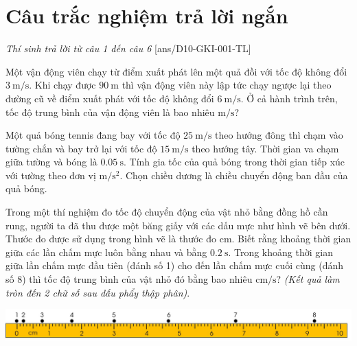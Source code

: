 \section{Câu trắc nghiệm trả lời ngắn} \textit{Thí sinh trả lời từ câu 1 đến câu 6}
\setcounter{ex}{0}
[ans/D10-GKI-001-TL]
\begin{ex}
	Một vận động viên chạy từ điểm xuất phát lên một quả đồi với tốc độ không đổi $\SI{3}{\meter/\second}$. Khi chạy được $\SI{90}{\meter}$ thì vận động viên này lập tức chạy ngược lại theo đường cũ về điểm xuất phát với tốc độ không đổi $\SI{6}{\meter/\second}$. Ở cả hành trình trên, tốc độ trung bình của vận động viên là bao nhiêu $\si{\meter/\second}$?
\end{ex}
\begin{ex}
	Một quả bóng tennis đang bay với tốc độ $\SI{25}{\meter/\second}$ theo hướng đông thì chạm vào tường chắn và bay trở lại với tốc độ $\SI{15}{\meter/\second}$ theo hướng tây. Thời gian va chạm giữa tường và bóng là $\SI{0.05}{\second}$. Tính gia tốc của quả bóng trong thời gian tiếp xúc với tường theo đơn vị $\si{\meter/\second^2}$. Chọn chiều dương là chiều chuyển động ban đầu của quả bóng.
	\loigiai{
	}
\end{ex}
\begin{ex}
	Trong một thí nghiệm đo tốc độ chuyển động của vật nhỏ bằng đồng hồ cần rung, người ta đã thu được một băng giấy với các dấu mực như hình vẽ bên dưới. Thước đo được sử dụng trong hình vẽ là thước đo $\si{\centi\meter}$. Biết rằng khoảng thời gian giữa các lần chấm mực luôn bằng nhau và bằng $\SI{0.2}{\second}$. Trong khoảng thời gian giữa lần chấm mực đầu tiên (đánh số 1) cho đến lần chấm mực cuối cùng (đánh số 8) thì tốc độ trung bình của vật nhỏ đó bằng bao nhiêu $\si{\centi\meter/\second}$?	\textit{(Kết quả làm tròn đến 2 chữ số sau dấu phẩy thập phân)}.
	\begin{center}
		\includegraphics[width=0.9\linewidth]{../figs/D10-2-15}
	\end{center}
	\loigiai{
		
	}
\end{ex}

